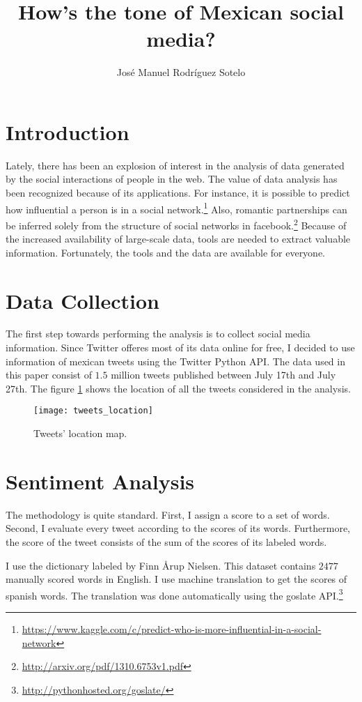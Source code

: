 \documentclass{article}
\title{How's the tone of Mexican social media?}
\author{Jos\'e Manuel Rodr\'iguez Sotelo}
\begin{document}
\maketitle

\section{Introduction}
Lately, there has been an explosion of interest in the analysis of data generated by the social interactions of people in the web. The value of data analysis has been recognized because of its applications. For instance, it is possible to predict how influential a person is in a social network.\footnote{\url{https://www.kaggle.com/c/predict-who-is-more-influential-in-a-social-network}} Also, romantic partnerships can be inferred solely from the structure of social networks in facebook.\footnote{\url{http://arxiv.org/pdf/1310.6753v1.pdf}} Because of the increased availability of large-scale data, tools are needed to extract valuable information. Fortunately, the tools and the data are available for everyone.

\section{Data Collection}
The first step towards performing the analysis is to collect social media information. Since Twitter offeres most of its data online for free, I decided to use information of mexican tweets using the Twitter Python API. The data used in this paper consist of $1.5$ million tweets published between July 17th and July 27th. The figure \ref{fig:tweets_location} shows the location of all the tweets considered in the analysis.

\begin{figure}[ht]
	\texttt{[image: tweets\_location]}
	\caption{Tweets' location map.}
	\label{fig:tweets_location}
\end{figure}

\section{Sentiment Analysis}
The methodology is quite standard. First, I assign a score to a set of words. Second, I evaluate every tweet according to the scores of its words. Furthermore, the score of the tweet consists of the sum of the scores of its labeled words.

I use the dictionary labeled by Finn {\AA}rup Nielsen. This dataset contains $2477$ manually scored words in English. I use machine translation to get the scores of spanish words. The translation was done automatically using the goslate API.\footnote{\url{http://pythonhosted.org/goslate/}}
\end{document}
